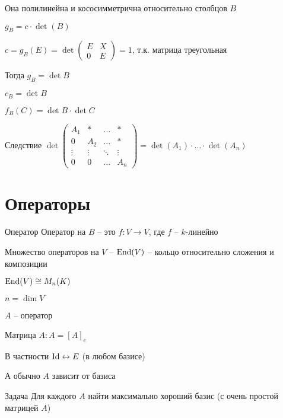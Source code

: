 \documentclass[12pt]{article}
\begin{document}
Она полилинейна и кососимметрична относительно столбцов $B$

$g_B = c \cdot \det(B)$

$c = g_B(E) = \det \begin{pmatrix}
    E & X \\
    0 & E
\end{pmatrix} = 1$, т.к. матрица треугольная

Тогда $g_B = \det B$

$c_B = \det B$

$f_B(C) = \det B \cdot \det C$

\begin{theo}{Следствие}
    $\det \begin{pmatrix}
        A_1 & * & \ldots & * \\
        0 & A_2 & \ldots & * \\
        \vdots & \vdots & \ddots & \vdots \\
        0 & 0 & \ldots & A_n
    \end{pmatrix} = \det (A_1) \cdot \ldots \cdot \det (A_n)$
\end{theo}

\section{Операторы}

\begin{defin}{Оператор}
    Оператор на $B$ -- это $f : V \to V$, где $f$ -- $k$-линейно
\end{defin}

\begin{defin}{}
    Множество операторов на $V$ -- $\operatorname{End}(V)$ -- кольцо относительно сложения и композиции

    $\operatorname{End}(V) \cong M_n(K)$

    $n = \dim V$
\end{defin}

\begin{Remark}{}
    $A$ -- оператор 

    Матрица $A : A = [A]_e$

    В частности $\operatorname{Id} \leftrightarrow E$ (в любом базисе)

    А обычно $A$ зависит от базиса
\end{Remark}

\begin{nota}{Задача}
    Для каждого $A$ найти максимально хороший базис (с очень простой матрицей $A$)
\end{nota}
\end{document}
